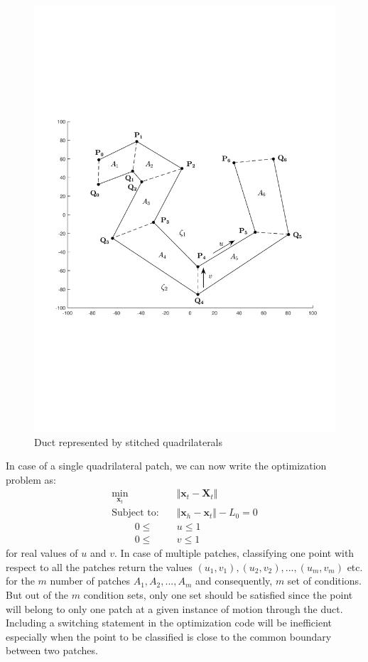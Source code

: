\documentclass[12pt,a4]{article}
\begin{document}
\begin{figure}[h]
\centering
\includegraphics[scale=0.5]{figures/fig7.pdf}
\caption{Duct represented by stitched quadrilaterals\label{fig:stitchequads}}
\end{figure}

 In case of a single quadrilateral patch, we can now write the optimization problem as:
 \begin{align}
 \label{eq:minx,u,v}
\min_{\textbf{x}_t} &\Vert \textbf{x}_t-\textbf{X}_t \Vert\\
\text{Subject to:~~~} &\Vert \textbf{x}_h - \textbf{x}_t \Vert -L_0 = 0\\
\text{~~~~~~~} 0 \leq &u \leq 1\\
\text{~~~~~~~} 0 \leq &v \leq 1
\end{align}
for real values of ${u}$ and ${v}$. In case of multiple patches, classifying one point with respect to all the patches return the values $\left({u}_1,{v}_1 \right), \left({u}_2,{v}_2 \right),...,\left({u}_m,{v}_m \right)$ etc. for the $m$ number of patches $A_1, A_2,..., A_m$ and consequently, $m$ set of conditions. But out of the $m$ condition sets, only one set should be satisfied since the point will belong to only one patch at a given instance of motion through the duct. Including a switching  statement in the optimization code will be inefficient especially when the point to be classified is close to the common boundary between two patches. 
\end{document}
